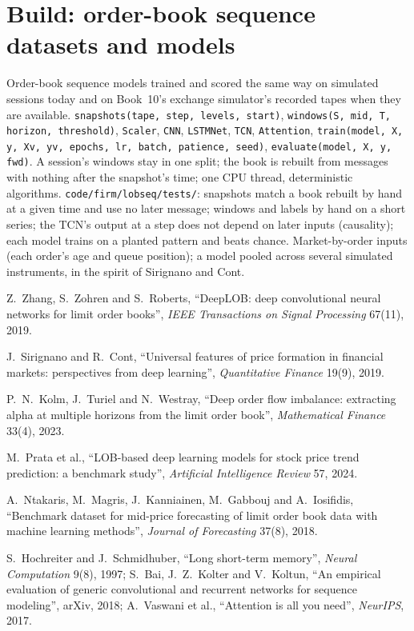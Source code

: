 \section{Build: order-book sequence datasets and models}\label{bld:ml:sequence-models-on-order-books:lobseq}

\begin{build}
 Order-book sequence models trained and scored the same way on simulated sessions today and on Book~10's
exchange simulator's recorded tapes when they are available.
 \texttt{snapshots(tape, step, levels, start)}, \texttt{windows(S, mid, T, horizon, threshold)},
\texttt{Scaler}, \texttt{CNN}, \texttt{LSTMNet}, \texttt{TCN}, \texttt{Attention}, \texttt{train(model, X, y, Xv, yv,
epochs, lr, batch, patience, seed)}, \texttt{evaluate(model, X, y, fwd)}.
 A session's windows stay in one split; the book is rebuilt from messages with nothing after the snapshot's
time; one CPU thread, deterministic algorithms.
 \texttt{code/firm/lobseq/tests/}: snapshots match a book rebuilt by hand at a given time and use
no later message; windows and labels by hand on a short series; the TCN's output at a step does not depend on later
inputs (causality); each model trains on a planted pattern and beats chance.
 Market-by-order inputs (each order's age and queue position); a model pooled across several simulated
instruments, in the spirit of Sirignano and Cont.
\end{build}

\begin{omsources}
\item Z.~Zhang, S.~Zohren and S.~Roberts, ``DeepLOB: deep convolutional neural networks for limit order books'',
\emph{IEEE Transactions on Signal Processing} 67(11), 2019.
\item J.~Sirignano and R.~Cont, ``Universal features of price formation in financial markets: perspectives from deep
learning'', \emph{Quantitative Finance} 19(9), 2019.
\item P.~N.~Kolm, J.~Turiel and N.~Westray, ``Deep order flow imbalance: extracting alpha at multiple horizons from the
limit order book'', \emph{Mathematical Finance} 33(4), 2023.
\item M.~Prata et al., ``LOB-based deep learning models for stock price trend prediction: a benchmark study'',
\emph{Artificial Intelligence Review} 57, 2024.
\item A.~Ntakaris, M.~Magris, J.~Kanniainen, M.~Gabbouj and A.~Iosifidis, ``Benchmark dataset for mid-price forecasting of
limit order book data with machine learning methods'', \emph{Journal of Forecasting} 37(8), 2018.
\item S.~Hochreiter and J.~Schmidhuber, ``Long short-term memory'', \emph{Neural Computation} 9(8), 1997; S.~Bai, J.~Z.~Kolter
and V.~Koltun, ``An empirical evaluation of generic convolutional and recurrent networks for sequence modeling'', arXiv,
2018; A.~Vaswani et al., ``Attention is all you need'', \emph{NeurIPS}, 2017.
\end{omsources}

